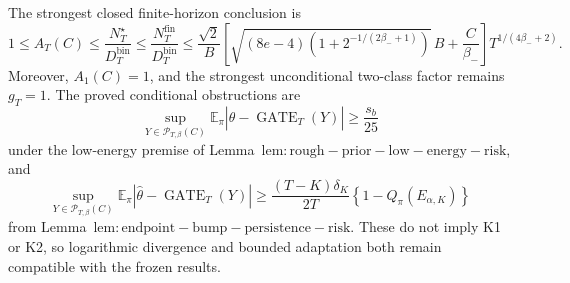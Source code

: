 The strongest closed finite-horizon conclusion is
\[
1\le A_T(C)\le\frac{N_T^\star}{D_T^{\mathrm{bin}}}\le\frac{N_T^{\mathrm{fin}}}{D_T^{\mathrm{bin}}}\le\frac{\sqrt2}{B}\left[\sqrt{(8e-4)\left(1+2^{-1/(2\beta_-+1)}\right)}\,B+\frac C{\beta_-}\right]T^{1/(4\beta_-+2)}.
\]
Moreover, \(A_1(C)=1\), and the strongest unconditional two-class factor remains \(g_T=1\). The proved conditional obstructions are
\[
\sup_{Y\in\mathcal P_{T,\beta}(C)}\mathbb E_\pi\left|\widehat\theta-\operatorname{GATE}_T(Y)\right|\ge \frac{s_b}{25}
\]
under the low-energy premise of Lemma~\(\mathrm{lem:rough-prior-low-energy-risk}\), and
\[
\sup_{Y\in\mathcal P_{T,\beta}(C)}\mathbb E_\pi\left|\widehat\theta-\operatorname{GATE}_T(Y)\right|\ge\frac{(T-K)\delta_K}{2T}\left\{1-Q_\pi(E_{\alpha,K})\right\}
\]
from Lemma~\(\mathrm{lem:endpoint-bump-persistence-risk}\). These do not imply K1 or K2, so logarithmic divergence and bounded adaptation both remain compatible with the frozen results.